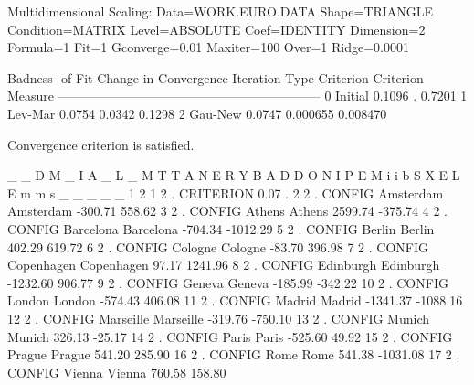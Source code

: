 \documentclass{article}
\begin{document}
\begin{Woutput}
Multidimensional Scaling:  Data=WORK.EURO.DATA
Shape=TRIANGLE Condition=MATRIX Level=ABSOLUTE
Coef=IDENTITY Dimension=2 Formula=1 Fit=1
 Gconverge=0.01 Maxiter=100 Over=1 Ridge=0.0001

                          Badness-
                            of-Fit    Change in    Convergence
Iteration    Type        Criterion    Criterion        Measure
--------------------------------------------------------------
      0      Initial        0.1096            .         0.7201
      1      Lev-Mar        0.0754       0.0342         0.1298
      2      Gau-New        0.0747     0.000655       0.008470

Convergence criterion is satisfied.

     _   _
     D   M               _
     I   A       _       L            _
     M   T       T       A            N
     E   R       Y       B            A                   D       D
 O   N   I       P       E            M                   i       i
 b   S   X       E       L            E                   m       m
 s   _   _       _       _            _                   1       2
 1   2   .   CRITERION                                 0.07        .
 2   2   .   CONFIG      Amsterdam    Amsterdam     -300.71     558.62
 3   2   .   CONFIG      Athens       Athens        2599.74    -375.74
 4   2   .   CONFIG      Barcelona    Barcelona     -704.34   -1012.29
 5   2   .   CONFIG      Berlin       Berlin         402.29     619.72
 6   2   .   CONFIG      Cologne      Cologne        -83.70     396.98
 7   2   .   CONFIG      Copenhagen   Copenhagen      97.17    1241.96
 8   2   .   CONFIG      Edinburgh    Edinburgh    -1232.60     906.77
 9   2   .   CONFIG      Geneva       Geneva        -185.99    -342.22
10   2   .   CONFIG      London       London        -574.43     406.08
11   2   .   CONFIG      Madrid       Madrid       -1341.37   -1088.16
12   2   .   CONFIG      Marseille    Marseille     -319.76    -750.10
13   2   .   CONFIG      Munich       Munich         326.13     -25.17
14   2   .   CONFIG      Paris        Paris         -525.60      49.92
15   2   .   CONFIG      Prague       Prague         541.20     285.90
16   2   .   CONFIG      Rome         Rome           541.38   -1031.08
17   2   .   CONFIG      Vienna       Vienna         760.58     158.80


\end{Woutput}
\end{document}
